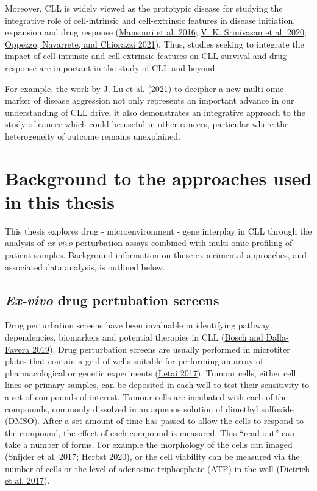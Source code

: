 \documentclass[11pt, a4paper, twosided]{book}
\begin{document}
Moreover, CLL is widely viewed as the prototypic disease for studying the integrative role of cell-intrinsic and cell-extrinsic features in disease initiation, expansion and drug response (\protect\hyperlink{ref-Mansouri2016}{Mansouri et al. 2016}; \protect\hyperlink{ref-Srinivasan2020}{V. K. Srinivasan et al. 2020}; \protect\hyperlink{ref-Oppezzo2021}{Oppezzo, Navarrete, and Chiorazzi 2021}). Thus, studies seeking to integrate the impact of cell-intrinsic and cell-extrinsic features on CLL survival and drug response are important in the study of CLL and beyond.

For example, the work by \protect\hyperlink{ref-Lu2021}{J. Lu et al.} (\protect\hyperlink{ref-Lu2021}{2021}) to decipher a new multi-omic marker of disease aggression not only represents an important advance in our understanding of CLL drive, it also demonstrates an integrative approach to the study of cancer which could be useful in other cancers, particular where the heterogeneity of outcome remains unexplained.

\hypertarget{background-approaches-intro}{%
\section{Background to the approaches used in this thesis}\label{background-approaches-intro}}

This thesis explores drug - microenvironment - gene interplay in CLL through the analysis of \emph{ex vivo} perturbation assays combined with multi-omic profiling of patient samples. Background information on these experimental approaches, and associated data analysis, is outlined below.

\hypertarget{drug-perturbation-screens-intro}{%
\subsection{\texorpdfstring{\emph{Ex-vivo} drug pertubation screens}{Ex-vivo drug pertubation screens}}\label{drug-perturbation-screens-intro}}

Drug perturbation screens have been invaluable in identifying pathway dependencies, biomarkers and potential therapies in CLL (\protect\hyperlink{ref-Bosch2019}{Bosch and Dalla-Favera 2019}). Drug perturbation screens are usually performed in microtiter plates that contain a grid of wells suitable for performing an array of pharmacological or genetic experiments (\protect\hyperlink{ref-Letai2017}{Letai 2017}). Tumour cells, either cell lines or primary samples, can be deposited in each well to test their sensitivity to a set of compounds of interest. Tumour cells are incubated with each of the compounds, commonly dissolved in an aqueous solution of dimethyl sulfoxide (DMSO). After a set amount of time has passed to allow the cells to respond to the compound, the effect of each compound is measured. This ``read-out'' can take a number of forms. For example the morphology of the cells can imaged (\protect\hyperlink{ref-Snijder2017}{Snijder et al. 2017}; \protect\hyperlink{ref-HerbstThesis}{Herbst 2020}), or the cell viability can be measured via the number of cells or the level of adenosine triphosphate (ATP) in the well (\protect\hyperlink{ref-JCIpaper}{Dietrich et al. 2017}).
\end{document}
